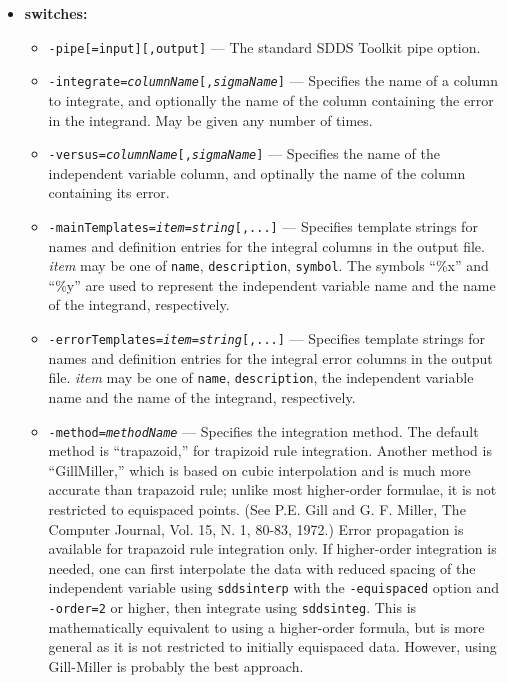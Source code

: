 \begin{itemize}
\item {\bf switches:}
    \begin{itemize}
    \item {\tt -pipe[=input][,output]} --- The standard SDDS Toolkit pipe option.
    \item {\tt -integrate={\em columnName}[,{\em sigmaName}]} --- Specifies the name
        of a column to integrate, and optionally the name of the column containing
        the error in the integrand.  May be given any number of times.
    \item {\tt -versus={\em columnName}[,{\em sigmaName}]} --- Specifies the name
        of the independent variable column, and optinally the name of the column
        containing its error.
    \item {\tt -mainTemplates={\em item}={\em string}[,...]} --- Specifies template
        strings for  names and definition entries for the integral columns
         in the output file.  {\em item} may be one of {\tt name}, {\tt description},
        {\tt symbol}.  The symbols ``\%x'' and ``\%y'' are used to represent
        the independent variable name and the name of the integrand, respectively.
    \item {\tt -errorTemplates={\em item}={\em string}[,...]} --- Specifies template
        strings for  names and definition entries for the integral error columns
        in the output file.  {\em item} may be one of {\tt name}, {\tt description},
        the independent variable name and the name of the integrand, respectively.
    \item {\tt -method={\em methodName}} --- Specifies the integration method.  The default method
        is ``trapazoid,'' for trapizoid rule integration.
        Another method is ``GillMiller,'' which is based on cubic interpolation and is much more
        accurate than trapazoid rule; unlike most higher-order formulae, it is not restricted to
        equispaced points.  (See P.E. Gill and G. F. Miller, The Computer Journal, Vol. 15, N. 1, 80-83, 1972.)
        Error propagation is available for trapazoid rule integration only.
        If higher-order integration is needed, one can first interpolate the data with reduced
        spacing of the independent variable using {\tt sddsinterp} with the {\tt -equispaced} option and
        {\tt -order=2} or higher, then integrate using {\tt sddsinteg}.
        This is mathematically equivalent to using a higher-order formula, but is 
        more general as it is not restricted to initially equispaced data.
        However, using Gill-Miller is probably the best approach.

\end{itemize}
\end{itemize}
